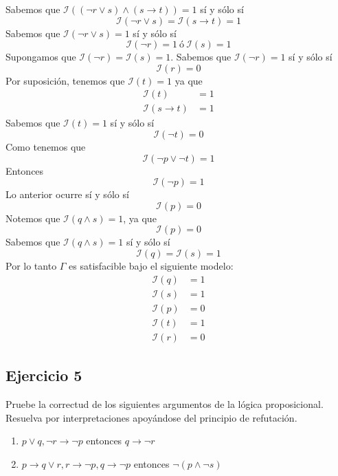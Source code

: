 \documentclass[a4paper]{article}
\begin{document}
Sabemos que \(\mathcal{I}\left((\lnot r \lor s) \land (s\to t) \right) = 1\) sí y sólo sí
\[
    \mathcal{I}\left(\lnot r \lor s\right) = \mathcal{I}\left(s\to t \right) = 1
\]
Sabemos que \(\mathcal{I}\left(\lnot r \lor s\right) = 1\) sí y sólo sí
\[
    \mathcal{I}\left(\lnot r\right) = 1 \ \text{ó} \ \mathcal{I}\left(s\right) = 1
\]
Supongamos que \(\mathcal{I}\left(\lnot r\right) = \mathcal{I}\left(s\right) = 1\).
Sabemos que \(\mathcal{I}\left(\lnot r\right) = 1\) sí y sólo sí
\[
    \mathcal{I}\left(r\right) = 0
\]
Por suposición, tenemos que \(\mathcal{I}\left(t\right) = 1\) ya que
\begin{align*}
    \mathcal{I}\left(t\right) &= 1 \\
    \mathcal{I}\left(s\to t \right) &= 1
\end{align*}
Sabemos que \(\mathcal{I}\left(t\right) = 1\) sí y sólo sí
\[
    \mathcal{I}\left(\neg t\right) = 0
\]
Como tenemos que 
\[
    \mathcal{I}\left(\lnot p \lor \lnot t\right) = 1
\]
Entonces
\[
    \mathcal{I}\left(\lnot p\right) = 1
\]
Lo anterior ocurre sí y sólo sí
\[
    \mathcal{I}\left(p\right) = 0
\]
Notemos que \(\mathcal{I}\left(q \land s\right) = 1\), ya que
\[
    \mathcal{I}\left(p\right) = 0
\]
Sabemos que \(\mathcal{I}\left(q \land s\right) = 1\) sí y sólo sí
\[
    \mathcal{I}\left(q\right) = \mathcal{I}\left(s\right) = 1
\]
Por lo tanto \(\Gamma\) es satisfacible bajo el siguiente modelo:
\begin{align*}
    \mathcal{I}\left(q\right) &= 1 \\
    \mathcal{I}\left(s\right) &= 1 \\
    \mathcal{I}\left(p\right) &= 0 \\
    \mathcal{I}\left(t\right) &= 1 \\
    \mathcal{I}\left(r\right) &= 0
\end{align*}
\subsection{Ejercicio 5}
Pruebe la correctud de los siguientes argumentos de la l\'ogica
proposicional. Resuelva por interpretaciones apoy\'andose del principio de
refutaci\'on.
\begin{enumerate}
\item $p \lor q, \lnot r \to \lnot p$ entonces $q \to \lnot r$
\item $p \to q \lor r, r \to \lnot p, q \to \lnot p$ entonces $\lnot (p
\land \lnot s)$
\end{enumerate}
\end{document}
